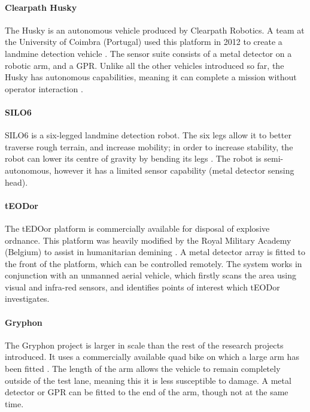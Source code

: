 \documentclass[main.tex]{subfiles}
\begin{document}
\paragraph{Clearpath Husky} The Husky is an autonomous vehicle produced by Clearpath Robotics. A team at the University of Coimbra (Portugal) used this platform in 2012 to create a landmine detection vehicle \parencite{hennessey2014}. The sensor suite consists of a metal detector on a robotic arm, and a GPR. Unlike all the other vehicles introduced so far, the Husky has autonomous capabilities, meaning it can complete a mission without operator interaction \parencite{portugal2014}.

\paragraph{SILO6} SILO6 is a six-legged landmine detection robot. The six legs allow it to better traverse rough terrain, and increase mobility; in order to increase stability, the robot can lower its centre of gravity by bending its legs \parencite{santos2007}. The robot is semi-autonomous, however it has a limited sensor capability (metal detector sensing head).

\paragraph{tEODor} The tEDOor platform is commercially available for disposal of explosive ordnance. This platform was heavily modified by the Royal Military Academy (Belgium) to assist in humanitarian demining \parencite{cubber2014}. A metal detector array is fitted to the front of the platform, which can be controlled remotely. The system works in conjunction with an unmanned aerial vehicle, which firstly scans the area using visual and infra-red sensors, and identifies points of interest which tEODor investigates.   

\paragraph{Gryphon}
The Gryphon project is larger in scale than the rest of the research projects introduced. It uses a commercially available quad bike on which a large arm has been fitted \parencite{fukushima2008}. The length of the arm allows the vehicle to remain completely outside of the test lane, meaning this it is less susceptible to damage. A metal detector or GPR can be fitted to the end of the arm, though not at the same time.
\end{document}

